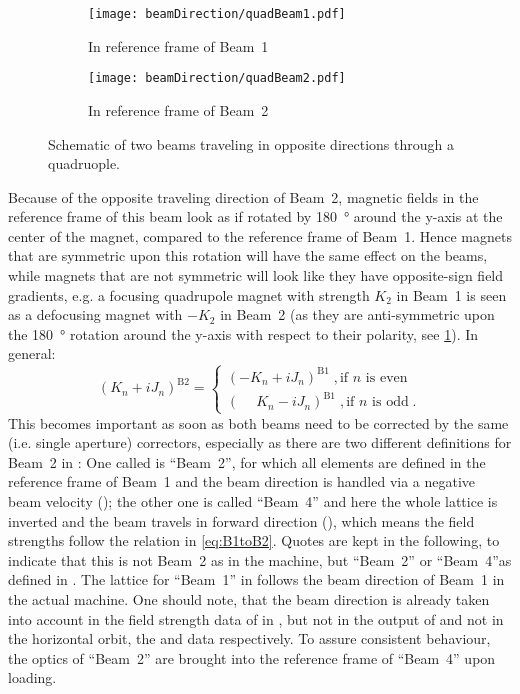 \begin{figure}[h!]
    \centering
    \begin{subfigure}{0.4\textwidth}
        \texttt{[image: beamDirection/quadBeam1.pdf]}
        \caption{In reference frame of Beam~1}
    \end{subfigure}
    \hspace{2em}
    \begin{subfigure}{0.4\textwidth}
        \texttt{[image: beamDirection/quadBeam2.pdf]}
        \caption{In reference frame of Beam~2}
    \end{subfigure}
    \caption{Schematic of two beams traveling in opposite directions through a quadruople.}
    \label{fig:BeamDirection}
\end{figure}

Because of the opposite traveling direction of Beam~2, magnetic fields in the reference frame of this beam look as if rotated
by \qty{180}{\degree} around the y-axis at the center of the magnet, compared to the reference frame of Beam~1.
Hence magnets that are symmetric upon this rotation will have the same effect on the beams, 
while magnets that are not symmetric will look like they have opposite-sign field gradients,
e.g. a focusing quadrupole magnet with strength $K_2$ in Beam~1 is seen as a defocusing magnet with $-K_2$ in Beam~2 
(as they are anti-symmetric upon the \qty{180}{\degree} rotation around the y-axis with respect to their polarity, see \cref{fig:BeamDirection}).
%
In general:
%
\begin{equation}
\label{eq:B1toB2}
(K_n + iJ_n)^\text{B2} =
\begin{cases}
        (-K_n + iJ_n)^\text{B1} \; , \text{if } n \text{ is even} \\
        (\phantom{-}K_n - iJ_n)^\text{B1} \; , \text{if } n \text{ is odd} \;.
\end{cases}
\end{equation}
%
This becomes important as soon as both beams need to be corrected by the same (i.e. single aperture) correctors, 
especially as there are two different definitions for Beam~2 in : 
One called is ``Beam~2'', 
for which all elements are defined in the reference frame of Beam~1 
and the beam direction is handled via a negative beam velocity (); 
the other one is called ``Beam~4'' and here the whole lattice is inverted and the beam travels in forward direction (),
which means the field strengths follow the relation in \cref{eq:B1toB2}.
Quotes are kept in the following, to indicate that this is not Beam~2 as in the machine, 
but ``Beam~2'' or ``Beam~4''as defined in .
The lattice for ``Beam~1'' in  follows the beam direction of Beam~1 in the actual machine.
One should note, that the beam direction is already taken into account in the field strength data of  
in , but not in the  output of  and not in the horizontal orbit, the  and  data respectively.
To assure consistent behaviour, the optics of ``Beam~2'' are brought into the reference frame of ``Beam~4'' upon loading.

